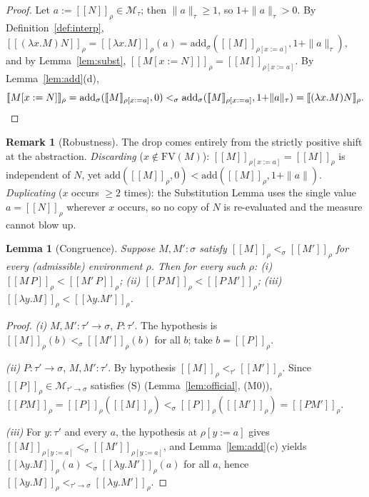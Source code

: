 \documentclass{amsart}
\newtheorem{lemma}{Lemma}
\theoremstyle{definition}
\newtheorem{remark}{Remark}
\newcommand{\interp}[1]{[\![#1]\!]}
\newcommand{\FV}{\mathrm{FV}}
\begin{document}
\begin{proof}
Let $a:=\interp N_\rho\in\mathcal M_\tau$; then $\|a\|_\tau\ge1$, so $1+\|a\|_\tau>0$. By
Definition~\ref{def:interp},
$\interp{(\lambda x.M)N}_\rho=\interp{\lambda x.M}_\rho(a)=
\mathrm{add}_\sigma(\interp{M}_{\rho[x:=a]},1{+}\|a\|_\tau)$, and by Lemma~\ref{lem:subst},
$\interp{M[x:=N]}_\rho=\interp{M}_{\rho[x:=a]}$. By Lemma~\ref{lem:add}(d),
\[
  \interp{M[x:=N]}_\rho=\mathrm{add}_\sigma(\interp{M}_{\rho[x:=a]},0)
  <_\sigma\mathrm{add}_\sigma(\interp{M}_{\rho[x:=a]},1{+}\|a\|_\tau)=\interp{(\lambda x.M)N}_\rho.\qedhere
\]
\end{proof}

\begin{remark}[Robustness]
The drop comes entirely from the strictly positive shift at the abstraction.
\emph{Discarding} ($x\notin\FV(M)$): $\interp{M}_{\rho[x:=a]}=\interp{M}_\rho$ is independent
of $N$, yet $\mathrm{add}(\interp M_\rho,0)<\mathrm{add}(\interp M_\rho,1{+}\|a\|)$.
\emph{Duplicating} ($x$ occurs $\ge2$ times): the Substitution Lemma uses the single value
$a=\interp N_\rho$ wherever $x$ occurs, so no copy of $N$ is re-evaluated and the measure
cannot blow up.
\end{remark}

\begin{lemma}[Congruence]\label{lem:cong}
Suppose $M,M':\sigma$ satisfy $\interp{M}_\rho<_\sigma\interp{M'}_\rho$ for every
\emph{(}admissible\emph{)} environment $\rho$. Then for every such $\rho$:
\textup{(i)} $\interp{M\,P}_\rho<\interp{M'\,P}_\rho$;
\textup{(ii)} $\interp{P\,M}_\rho<\interp{P\,M'}_\rho$;
\textup{(iii)} $\interp{\lambda y.M}_\rho<\interp{\lambda y.M'}_\rho$.
\end{lemma}

\begin{proof}
\emph{(i)} $M,M':\tau'\to\sigma$, $P:\tau'$. The hypothesis is
$\interp{M}_\rho(b)<_\sigma\interp{M'}_\rho(b)$ for all $b$; take $b=\interp P_\rho$.

\emph{(ii)} $P:\tau'\to\sigma$, $M,M':\tau'$. By hypothesis
$\interp{M}_\rho<_{\tau'}\interp{M'}_\rho$. Since $\interp P_\rho\in\mathcal M_{\tau'\to\sigma}$
satisfies (S) (Lemma~\ref{lem:official}, (M0)),
$\interp{PM}_\rho=\interp P_\rho(\interp M_\rho)<_\sigma\interp P_\rho(\interp{M'}_\rho)=\interp{PM'}_\rho$.

\emph{(iii)} For $y:\tau'$ and every $a$, the hypothesis at $\rho[y:=a]$ gives
$\interp{M}_{\rho[y:=a]}<_\sigma\interp{M'}_{\rho[y:=a]}$, and Lemma~\ref{lem:add}(c) yields
$\interp{\lambda y.M}_\rho(a)<_\sigma\interp{\lambda y.M'}_\rho(a)$ for all $a$, hence
$\interp{\lambda y.M}_\rho<_{\tau'\to\sigma}\interp{\lambda y.M'}_\rho$.
\end{proof}
\end{document}
